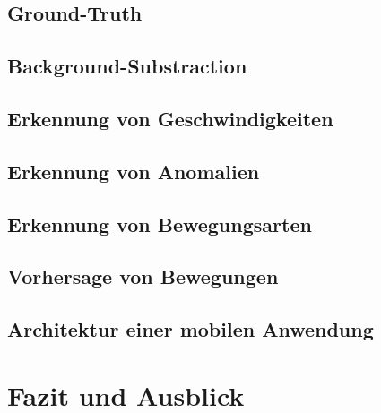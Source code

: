 \documentclass{hsflensburg}
\begin{document}
  \section{Ground-Truth}
  \section{Background-Substraction}
  \section{Erkennung von Geschwindigkeiten}
  \section{Erkennung von Anomalien}
  \section{Erkennung von Bewegungsarten}
  \section{Vorhersage von Bewegungen}
  \section{Architektur einer mobilen Anwendung}

  \chapter{Fazit und Ausblick}

  \printbibliography
\end{document}
